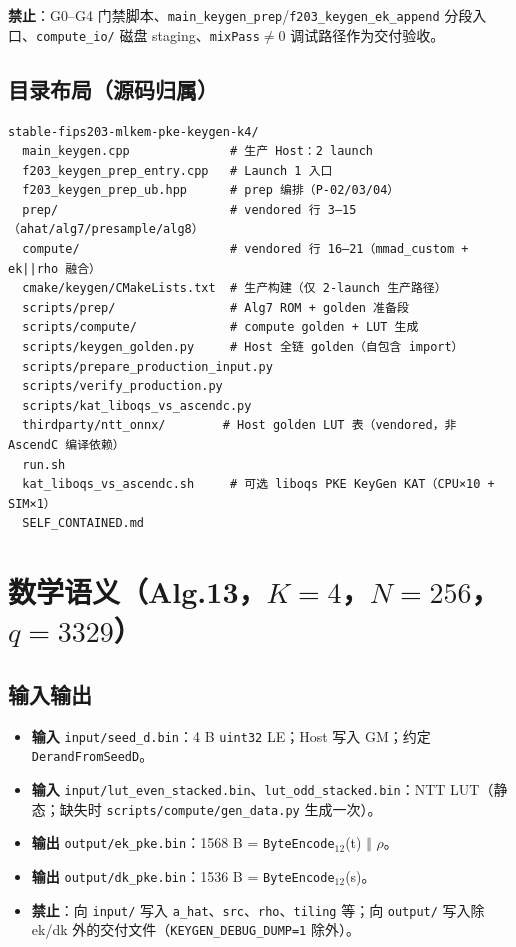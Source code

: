 \documentclass[UTF8,a4paper,11pt]{ctexart}
\begin{document}
\textbf{禁止}：G0--G4 门禁脚本、\texttt{main\_keygen\_prep}/\texttt{f203\_keygen\_ek\_append} 分段入口、\texttt{compute\_io/} 磁盘 staging、\texttt{mixPass}$\neq$0 调试路径作为交付验收。

\subsection{目录布局（源码归属）}

\begin{verbatim}
stable-fips203-mlkem-pke-keygen-k4/
  main_keygen.cpp              # 生产 Host：2 launch
  f203_keygen_prep_entry.cpp   # Launch 1 入口
  f203_keygen_prep_ub.hpp      # prep 编排（P-02/03/04）
  prep/                        # vendored 行 3–15（ahat/alg7/presample/alg8）
  compute/                     # vendored 行 16–21（mmad_custom + ek||rho 融合）
  cmake/keygen/CMakeLists.txt  # 生产构建（仅 2-launch 生产路径）
  scripts/prep/                # Alg7 ROM + golden 准备段
  scripts/compute/             # compute golden + LUT 生成
  scripts/keygen_golden.py     # Host 全链 golden（自包含 import）
  scripts/prepare_production_input.py
  scripts/verify_production.py
  scripts/kat_liboqs_vs_ascendc.py
  thirdparty/ntt_onnx/        # Host golden LUT 表（vendored，非 AscendC 编译依赖）
  run.sh
  kat_liboqs_vs_ascendc.sh     # 可选 liboqs PKE KeyGen KAT（CPU×10 + SIM×1）
  SELF_CONTAINED.md
\end{verbatim}

\section{数学语义（Alg.13，$K=4$，$N=256$，$q=3329$）}

\subsection{输入输出}

\begin{itemize}
  \item \textbf{输入} \texttt{input/seed\_d.bin}：4 B \texttt{uint32} LE；Host 写入 GM；约定 \texttt{DerandFromSeedD}。
  \item \textbf{输入} \texttt{input/lut\_even\_stacked.bin}、\texttt{lut\_odd\_stacked.bin}：NTT LUT（静态；缺失时 \texttt{scripts/compute/gen\_data.py} 生成一次）。
  \item \textbf{输出} \texttt{output/ek\_pke.bin}：1568 B = \texttt{ByteEncode$_{12}$}(t) $\Vert$ $\rho$。
  \item \textbf{输出} \texttt{output/dk\_pke.bin}：1536 B = \texttt{ByteEncode$_{12}$}(s)。
  \item \textbf{禁止}：向 \texttt{input/} 写入 \texttt{a\_hat}、\texttt{src}、\texttt{rho}、\texttt{tiling} 等；向 \texttt{output/} 写入除 ek/dk 外的交付文件（\texttt{KEYGEN\_DEBUG\_DUMP=1} 除外）。
\end{itemize}
\end{document}
